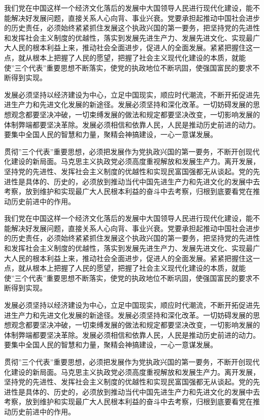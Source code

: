 \documentclass{njuthesis}
\begin{document}
我们党在中国这样一个经济文化落后的发展中大国领导人民进行现代化建设，能不能解决好发展问题，直接关系人心向背、事业兴衰。党要承担起推动中国社会进步的历史责任，必须始终紧紧抓住发展这个执政兴国的第一要务，把坚持党的先进性和发挥社会主义制度的优越性，落实到发展先进生产力、发展先进文化、实现最广大人民的根本利益上来，推动社会全面进步，促进人的全面发展。紧紧把握住这一点，就从根本上把握了人民的愿望，把握了社会主义现代化建设的本质，就能使”三个代表”重要思想不断落实，使党的执政地位不断巩固，使强国富民的要求不断得到实现。 

发展必须坚持以经济建设为中心，立足中国现实，顺应时代潮流，不断开拓促进先进生产力和先进文化发展的新途径。发展必须坚持和深化改革。一切妨碍发展的思想观念都要坚决冲破，一切束缚发展的做法和规定都要坚决改变，一切影响发展的体制弊端都要坚决革除。发展必须相信和依靠人民，人民是推动历史前进的动力。要集中全国人民的智慧和力量，聚精会神搞建设，一心一意谋发展。 

贯彻”三个代表”重要思想，必须把发展作为党执政兴国的第一要务，不断开创现代化建设的新局面。马克思主义执政党必须高度重视解放和发展生产力。离开发展，坚持党的先进性、发挥社会主义制度的优越性和实现民富国强都无从谈起。党的先进性是具体的、历史的，必须放到推动当代中国先进生产力和先进文化的发展中去考察，放到维护和实现最广大人民根本利益的奋斗中去考察，归根到底要看党在推动历史前进中的作用。 

我们党在中国这样一个经济文化落后的发展中大国领导人民进行现代化建设，能不能解决好发展问题，直接关系人心向背、事业兴衰。党要承担起推动中国社会进步的历史责任，必须始终紧紧抓住发展这个执政兴国的第一要务，把坚持党的先进性和发挥社会主义制度的优越性，落实到发展先进生产力、发展先进文化、实现最广大人民的根本利益上来，推动社会全面进步，促进人的全面发展。紧紧把握住这一点，就从根本上把握了人民的愿望，把握了社会主义现代化建设的本质，就能使”三个代表”重要思想不断落实，使党的执政地位不断巩固，使强国富民的要求不断得到实现。 

发展必须坚持以经济建设为中心，立足中国现实，顺应时代潮流，不断开拓促进先进生产力和先进文化发展的新途径。发展必须坚持和深化改革。一切妨碍发展的思想观念都要坚决冲破，一切束缚发展的做法和规定都要坚决改变，一切影响发展的体制弊端都要坚决革除。发展必须相信和依靠人民，人民是推动历史前进的动力。要集中全国人民的智慧和力量，聚精会神搞建设，一心一意谋发展。 

贯彻”三个代表”重要思想，必须把发展作为党执政兴国的第一要务，不断开创现代化建设的新局面。马克思主义执政党必须高度重视解放和发展生产力。离开发展，坚持党的先进性、发挥社会主义制度的优越性和实现民富国强都无从谈起。党的先进性是具体的、历史的，必须放到推动当代中国先进生产力和先进文化的发展中去考察，放到维护和实现最广大人民根本利益的奋斗中去考察，归根到底要看党在推动历史前进中的作用。 
\end{document}
